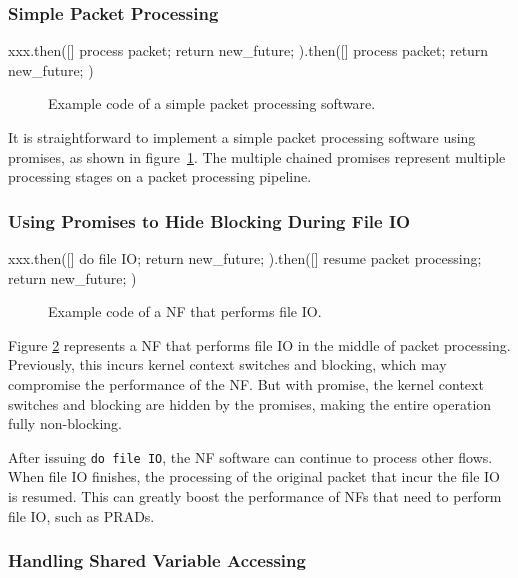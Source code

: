 \subsubsection{Simple Packet Processing}

\begin{verbbox}
xxx.then([]{
  process packet;
  return new_future;
}).then([]{
  process packet;
  return new_future;
})
  
\end{verbbox}
\begin{figure}[!h]
\resizebox{0.5\columnwidth}{!}{\theverbbox}
\caption{Example code of a simple packet processing software.} 
\label{fig:spps}
\end{figure}

It is straightforward to implement a simple packet processing software using
promises, as shown in figure~\ref{fig:spps}. The multiple chained promises
represent multiple processing stages on a packet processing pipeline.

\subsubsection{Using Promises to Hide Blocking During File IO}

\begin{verbbox}
xxx.then([]{
  do file IO;
  return new_future;
}).then([]{
  resume packet processing;
  return new_future;
})
  
\end{verbbox}
\begin{figure}[!h]
\resizebox{0.5\columnwidth}{!}{\theverbbox}
\caption{Example code of a NF that performs file IO.} 
\label{fig:file-io}
\end{figure}

Figure \ref{fig:file-io} represents a NF that performs file IO in the middle of
packet processing. Previously, this incurs kernel context switches and blocking,
which may compromise the performance of the NF. But with promise, the kernel
context switches and blocking are hidden by the promises, making the entire
operation fully non-blocking.

After issuing \verb!do file IO!, the NF software can continue to process other
flows. When file IO finishes, the processing of the original packet that incur
the file IO is resumed. This can greatly boost the performance of NFs that need
to perform file IO, such as PRADs.

\subsubsection{Handling Shared Variable Accessing}

